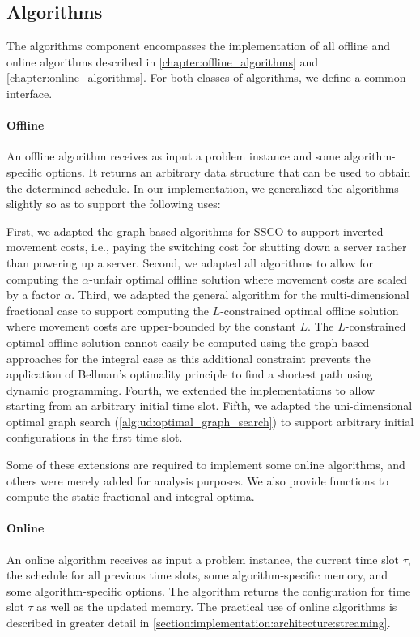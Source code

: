\subsection{Algorithms}

The algorithms component encompasses the implementation of all offline and online algorithms described in \cref{chapter:offline_algorithms} and \cref{chapter:online_algorithms}. For both classes of algorithms, we define a common interface.

\paragraph{Offline} An offline algorithm receives as input a problem instance and some algorithm-specific options. It returns an arbitrary data structure that can be used to obtain the determined schedule. In our implementation, we generalized the algorithms slightly so as to support the following uses:

First, we adapted the graph-based algorithms for SSCO to support inverted movement costs, i.e., paying the switching cost for shutting down a server rather than powering up a server. Second, we adapted all algorithms to allow for computing the $\alpha$-unfair optimal offline solution where movement costs are scaled by a factor $\alpha$. Third, we adapted the general algorithm for the multi-dimensional fractional case to support computing the $L$-constrained optimal offline solution where movement costs are upper-bounded by the constant $L$. The $L$-constrained optimal offline solution cannot easily be computed using the graph-based approaches for the integral case as this additional constraint prevents the application of Bellman's optimality principle to find a shortest path using dynamic programming. Fourth, we extended the implementations to allow starting from an arbitrary initial time slot. Fifth, we adapted the uni-dimensional optimal graph search (\cref{alg:ud:optimal_graph_search}) to support arbitrary initial configurations in the first time slot.

Some of these extensions are required to implement some online algorithms, and others were merely added for analysis purposes. We also provide functions to compute the static fractional and integral optima.

\paragraph{Online} An online algorithm receives as input a problem instance, the current time slot $\tau$, the schedule for all previous time slots, some algorithm-specific memory, and some algorithm-specific options. The algorithm returns the configuration for time slot $\tau$ as well as the updated memory. The practical use of online algorithms is described in greater detail in \cref{section:implementation:architecture:streaming}.

